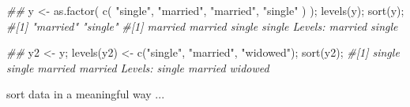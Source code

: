\documentclass[
]{article}
\newenvironment{Shaded}{}{}
\newcommand{\CommentTok}[1]{\textcolor[rgb]{0.38,0.63,0.69}{\textit{#1}}}
\newcommand{\DocumentationTok}[1]{\textcolor[rgb]{0.73,0.13,0.13}{\textit{#1}}}
\newcommand{\FunctionTok}[1]{\textcolor[rgb]{0.02,0.16,0.49}{#1}}
\newcommand{\NormalTok}[1]{#1}
\newcommand{\OtherTok}[1]{\textcolor[rgb]{0.00,0.44,0.13}{#1}}
\newcommand{\StringTok}[1]{\textcolor[rgb]{0.25,0.44,0.63}{#1}}
\begin{document}
\begin{Shaded}
\begin{Highlighting}[]
\DocumentationTok{\#\#}
\NormalTok{y }\OtherTok{\textless{}{-}}  \FunctionTok{as.factor}\NormalTok{( }\FunctionTok{c}\NormalTok{( }\StringTok{"single"}\NormalTok{, }\StringTok{"married"}\NormalTok{, }\StringTok{"married"}\NormalTok{, }\StringTok{"single"}\NormalTok{ ) );}
\FunctionTok{levels}\NormalTok{(y);}
\FunctionTok{sort}\NormalTok{(y);}
\CommentTok{\#[1] "married" "single" }
\CommentTok{\#[1] married married single  single Levels: married single}

\DocumentationTok{\#\# }
\NormalTok{y2 }\OtherTok{\textless{}{-}}\NormalTok{ y;}
\FunctionTok{levels}\NormalTok{(y2) }\OtherTok{\textless{}{-}} \FunctionTok{c}\NormalTok{(}\StringTok{"single"}\NormalTok{, }\StringTok{"married"}\NormalTok{, }\StringTok{"widowed"}\NormalTok{);}
\FunctionTok{sort}\NormalTok{(y2);}
\CommentTok{\#[1] single  single  married married Levels: single married widowed}
\end{Highlighting}
\end{Shaded}

sort data in a meaningful way ...
\end{document}
